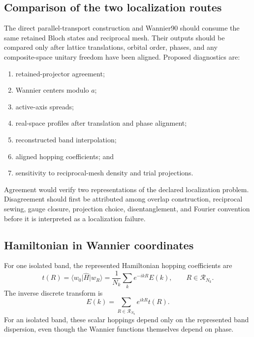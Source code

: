 \subsection*{Comparison of the two localization routes}

The direct parallel-transport construction and Wannier90 should consume the
same retained Bloch states and reciprocal mesh. Their outputs should be
compared only after lattice translations, orbital order, phases, and any
composite-space unitary freedom have been aligned. Proposed diagnostics are:
\begin{enumerate}
    \item retained-projector agreement;
    \item Wannier centers modulo $a$;
    \item active-axis spreads;
    \item real-space profiles after translation and phase alignment;
    \item reconstructed band interpolation;
    \item aligned hopping coefficients; and
    \item sensitivity to reciprocal-mesh density and trial projections.
\end{enumerate}
Agreement would verify two representations of the declared localization
problem. Disagreement should first be attributed among overlap construction,
reciprocal sewing, gauge closure, projection choice, disentanglement, and
Fourier convention before it is interpreted as a localization failure.

\subsection*{Hamiltonian in Wannier coordinates}

For one isolated band, the represented Hamiltonian hopping coefficients are
\begin{equation}
    t(R)
    =
    \langle w_0\rvert\hat H\lvert w_R\rangle
    =
    \frac{1}{N_k}
    \sum_k
    e^{-ikR}E(k),
    \qquad
    R\in\mathcal R_{N_k}.
\end{equation}
The inverse discrete transform is
\begin{equation}
    E(k)
    =
    \sum_{R\in\mathcal R_{N_k}}
    e^{ikR}t(R).
\end{equation}
For an isolated band, these scalar hoppings depend only on the represented band
dispersion, even though the Wannier functions themselves depend on phase.

